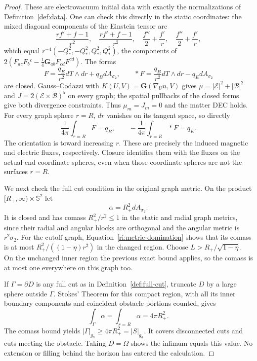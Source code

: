 \begin{proof}
These are electrovacuum initial data with exactly the
normalizations of Definition~\ref{def:data}.  One can check
this directly in the static coordinates: the mixed diagonal
components of the Einstein tensor are
\[
 \frac{rf'+f-1}{r^2},\quad
 \frac{rf'+f-1}{r^2},\quad
 \frac{f''}{2}+\frac{f'}r,\quad
 \frac{f''}{2}+\frac{f'}r,
\]
which equal $r^{-4}(-Q_*^2,-Q_*^2,Q_*^2,Q_*^2)$, the components
of
$2(F_{ac}F_b{}^c-\frac14\mathbf G_{ab}F_{cd}F^{cd})$.
The forms
\[
 F=\frac{q_E}{r^2}dT\wedge dr+q_BdA_{\sigma_2},\qquad
 *F=\frac{q_B}{r^2}dT\wedge dr-q_EdA_{\sigma_2}
\]
are closed.  Gauss--Codazzi with
$K(U,V)=\mathbf G(\nabla_U n,V)$ gives
$\mu=|\mathcal E|^2+|\mathcal B|^2$ and
$J=2(\mathcal E\times\mathcal B)^\flat$ on every graph; the
spatial pullbacks of the closed forms give both divergence
constraints.  Thus $\mu_m=J_m=0$ and the matter DEC holds.
For every graph sphere $r=R$, $dr$ vanishes on its tangent
space, so directly
\begin{equation}
\label{ri:example-flux}
 \frac1{4\pi}\int_{r=R}F=q_B,\qquad
 -\frac1{4\pi}\int_{r=R}*F=q_E.
\end{equation}
The orientation is toward increasing $r$.  These are precisely
the induced magnetic and electric fluxes, respectively.
Closure identifies them with the fluxes on the actual end
coordinate spheres, even when those coordinate spheres are
not the surfaces $r=R$.

We next check the full cut condition in the original graph
metric.  On the product $[R_+,\infty)\times\mathbb S^2$ let
\[
 \alpha=R_+^2dA_{\sigma_2}.
\]
It is closed and has comass $R_+^2/r^2\leq1$ in the static and
radial graph metrics, since their radial and angular blocks are
orthogonal and the angular metric is $r^2\sigma_2$.
For the cutoff graph, Equation~\eqref{ri:metric-domination}
shows that its comass is at most
$R_+^2/((1-\eta)r^2)$ in the changed region.  Choose
$L>R_+/\sqrt{1-\eta}$.  On the unchanged inner region the
previous exact bound applies, so the comass is at most one
everywhere on this graph too.

If $\Gamma=\partial D$ is any full cut as in
Definition~\ref{def:full-cut}, truncate $D$ by a large sphere
outside $\Gamma$.  Stokes' Theorem for this compact region,
with all its inner boundary components and coincident obstacle
portions counted, gives
\[
 \int_\Gamma\alpha=\int_{r=R}\alpha=4\pi R_+^2.
\]
The comass bound yields
$|\Gamma|_{g_h}\geq4\pi R_+^2=|S|_{g_h}$.
It covers disconnected cuts and cuts meeting the obstacle.
Taking $D=\Omega$ shows the infimum equals this value.  No
extension or filling behind the horizon has entered the
calculation.


\end{proof}

